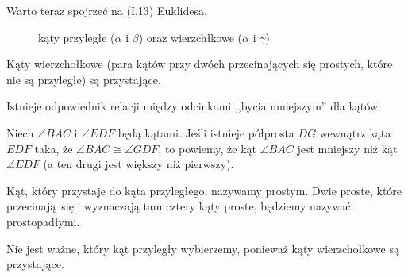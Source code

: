 Warto teraz spojrzeć na (I.13) Euklidesa.


\begin{figure}[H] \centering
{}
    \caption{kąty przyległe ($\alpha$ i $\beta$) oraz wierzchłkowe ($\alpha$ i $\gamma$)}
\end{figure}

\begin{proposition}
    Kąty wierzchołkowe (para kątów przy dwóch przecinających się prostych, które nie są przyległe) są przystające.
\end{proposition}


Istnieje odpowiednik relacji między odcinkami ,,bycia mniejszym'' dla kątów:

\begin{definition}
    Niech $\angle BAC$ i $\angle EDF$ będą kątami.
    Jeśli istnieje półprosta $DG$ wewnątrz kąta $EDF$ taka, że $\angle BAC \cong \angle GDF$, to powiemy, że kąt $\angle BAC$ jest mniejszy niż kąt $\angle EDF$ (a ten drugi jest większy niż pierwszy).
\end{definition}

\begin{definition}
    Kąt, który przystaje do kąta przyległego, nazywamy prostym.
    Dwie proste, które przecinają się i wyznaczają tam cztery kąty proste, będziemy nazywać prostopadłymi.
\end{definition}

Nie jest ważne, który kąt przyległy wybierzemy, ponieważ kąty wierzchołkowe są przystające.
